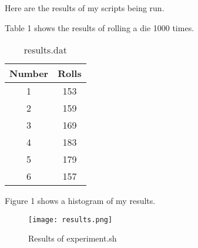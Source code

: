 \documentclass{article}
\begin{document}
Here are the results of my scripts being run.

Table 1 shows the results of rolling a die 1000 times. \\
\begin{table}
\centering
\begin{tabular}{c|c}
Number & Rolls\\
\hline
1 & 153\\
2 & 159\\
3 & 169\\
4 & 183\\
5 & 179\\
6 & 157\\
\end{tabular}
\caption{results.dat}
\label{tab:table1}
\end{table}

Figure 1 shows a histogram of my results.
\begin{figure}
\texttt{[image: results.png]}
\caption{Results of experiment.sh}
\label{fig:labelresults1}
\end{figure}
\end{document}
